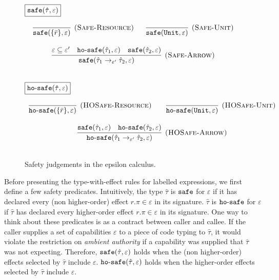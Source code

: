 \begin{figure}[h]

\noindent
$\fbox{$\mathtt{safe(\hat \tau, \varepsilon)}$}$

\[
\begin{array}{c}

\infer[\textsc{(Safe-Resource)}]
	{\kwa{safe}(\{ \bar r \}, \varepsilon)}
	{}
~~~~~
\infer[\textsc{(Safe-Unit)}]
	{\kwa{safe}(\kwa{Unit}, \varepsilon)}
	{} \\[3ex]

\infer[\textsc{(Safe-Arrow)}]
	{\kwa{safe}(\hat \tau_1 \rightarrow_{\varepsilon'} \hat \tau_2, \varepsilon)}
	{\varepsilon \subseteq \varepsilon' & \kwa{ho \hyphen safe}(\hat \tau_1, \varepsilon) & \kwa{safe}(\hat \tau_2, \varepsilon)} \\[3ex]

\end{array}
\]

\noindent
$\fbox{$\mathtt{ho \hbox{-} safe(\hat \tau, \varepsilon)}$}$

\[
\begin{array}{c}

\infer[\textsc{(HOSafe-Resource)}]
	{ \kwa{ho \hyphen safe}( \{ \bar r \}, \varepsilon)} 
	{}
	~~~~~~
\infer[\textsc{(HOSafe-Unit)}]
	{ \kwa{ho \hyphen safe}( \kwa{Unit}, \varepsilon)} 
	{}\\[3ex]

\infer[\textsc{(HOSafe-Arrow)}]
	{ \kwa{ho \hyphen safe}( \hat \tau_1 \rightarrow_{\varepsilon'} \hat \tau_2, \varepsilon ) }
	{ \kwa{safe}(\hat \tau_1, \varepsilon)  & \kwa{ho \hyphen safe}(\hat \tau_2, \varepsilon) }\\[3ex]

\end{array}
\]

\vspace{-7pt}
\caption{Safety judgements in the epsilon calculus.}
\label{This is the label.}
\end{figure}

\noindent 
Before presenting the type-with-effect rules for labelled expressions, we first define a few safety predicates. Intuitively, the type $\hat \tau$ is $\mathtt{safe}$ for $\varepsilon$ if it has declared every (non higher-order) effect $r.\pi \in \varepsilon$ in its signature. $\hat \tau$ is $\mathtt{ho \hbox{-} safe}$ for $\varepsilon$ if $\hat \tau$ has declared every higher-order effect $r.\pi \in \varepsilon$ in its signature. One way to think about these predicates is as a contract between caller and callee. If the caller supplies a set of capabilities $\varepsilon$ to a piece of code typing to $\hat \tau$, it would violate the restriction on \textit{ambient authority} if a capability was supplied that $\hat \tau$ was not expecting. Therefore, $\mathtt{safe}(\hat \tau, \varepsilon)$ holds when the (non higher-order) effects selected by $\hat \tau$ include $\varepsilon$. $\mathtt{ho \hbox{-} safe}(\hat \tau, \varepsilon)$ holds when the higher-order effects selected by $\hat  \tau$ include $\varepsilon$.

